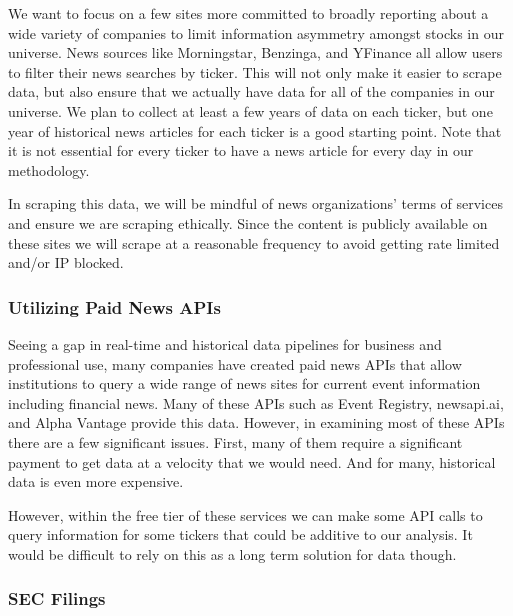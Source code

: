 We want to focus on a few sites more committed to broadly reporting about a wide 
variety of companies to limit information asymmetry amongst stocks in our universe. 
News sources like Morningstar, Benzinga, and YFinance all allow users to filter their 
news searches by ticker. This will not only make it easier to scrape data, but also 
ensure that we actually have data for all of the companies in our universe. We plan
to collect at least a few years of data on each ticker, but one year of historical 
news articles for each ticker is a good starting point. Note that it is not essential 
for every ticker to have a news article for every day in our methodology. 

In scraping this data, we will be mindful of news organizations’ terms of 
services and ensure we are scraping ethically. Since the content is publicly 
available on these sites we will scrape at a reasonable frequency to avoid getting 
rate limited and/or IP blocked.

\subsubsection{Utilizing Paid News APIs}

Seeing a gap in real-time and historical data pipelines for business and professional 
use, many companies have created paid news APIs that allow institutions to query a 
wide range of news sites for current event information including financial news. 
Many of these APIs such as Event Registry, newsapi.ai, and Alpha Vantage provide 
this data. However, in examining most of these APIs there are a few significant 
issues. First, many of them require a significant payment to get data at a velocity 
that we would need. And for many, historical data is even more expensive. 

However, within the free tier of these services we can make some API calls to 
query information for some tickers that could be additive to our analysis. It would
be difficult to rely on this as a long term solution for data though.

\subsubsection{SEC Filings}

